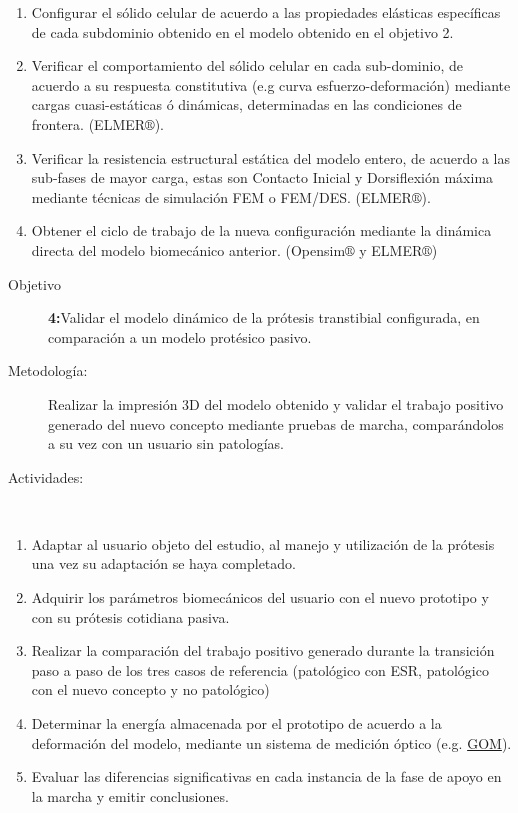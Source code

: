 \documentclass[12pt,english]{article}
\begin{document}
\begin{enumerate}
\item Configurar el sólido celular de acuerdo a las propiedades
elásticas específicas de cada subdominio obtenido en el modelo obtenido en el objetivo 2.
\item Verificar el comportamiento del sólido celular en cada sub-dominio, de acuerdo a su respuesta constitutiva (e.g curva esfuerzo-deformación) mediante cargas cuasi-estáticas ó dinámicas, determinadas en las condiciones de frontera. (ELMER$\circledR$).
\item Verificar la resistencia estructural estática del modelo entero, de acuerdo
a las sub-fases de mayor carga, estas son Contacto Inicial y Dorsiflexión
máxima mediante técnicas de simulación FEM
o FEM/DES. (ELMER$\circledR$).
\item Obtener el ciclo de trabajo de la nueva configuración mediante la
dinámica directa del modelo biomecánico anterior. (Opensim$\circledR$ y ELMER$\circledR$)
\end{enumerate}
\begin{description}
\item [{Objetivo}]  \textbf{ 4:}Validar el modelo dinámico de la prótesis
transtibial configurada, en comparación a un modelo protésico pasivo.
\item [{Metodología:}] Realizar la impresión 3D del modelo obtenido y validar el trabajo positivo generado del nuevo concepto mediante pruebas de marcha,
comparándolos a su vez con un usuario sin patologías.
\item [{Actividades:}]~\end{description}
\begin{enumerate}
\item Adaptar al usuario objeto del estudio, al manejo y utilización de
la prótesis una vez su adaptación se haya completado.
\item Adquirir los parámetros biomecánicos del usuario con el nuevo prototipo
y con su prótesis cotidiana pasiva.
\item Realizar la comparación del trabajo positivo generado durante la transición paso a paso de los tres casos de referencia (patológico con ESR, patológico con el nuevo concepto y no patológico)
\item Determinar la energía almacenada por el prototipo de acuerdo a la deformación del modelo, mediante un sistema de medición óptico (e.g. \href{http://www.gom.com/industries/medical-technology/biomechanics.html}{GOM}).
\item Evaluar las diferencias significativas en cada instancia de la fase
de apoyo en la marcha y emitir conclusiones.
\end{enumerate}
\end{document}
